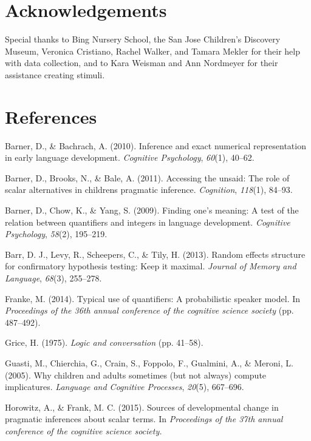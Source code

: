 \documentclass[10pt, letterpaper]{article}
\begin{document}
\section{Acknowledgements}\label{acknowledgements}

Special thanks to Bing Nursery School, the San Jose Children's Discovery
Museum, Veronica Cristiano, Rachel Walker, and Tamara Mekler for their
help with data collection, and to Kara Weisman and Ann Nordmeyer for
their assistance creating stimuli.

\section{References}\label{references}

\setlength{\parindent}{-0.1in} \setlength{\leftskip}{0.125in} \noindent

Barner, D., \& Bachrach, A. (2010). Inference and exact numerical
representation in early language development. \emph{Cognitive
Psychology}, \emph{60}(1), 40--62.

Barner, D., Brooks, N., \& Bale, A. (2011). Accessing the unsaid: The
role of scalar alternatives in childrens pragmatic inference.
\emph{Cognition}, \emph{118}(1), 84--93.

Barner, D., Chow, K., \& Yang, S. (2009). Finding one's meaning: A test
of the relation between quantifiers and integers in language
development. \emph{Cognitive Psychology}, \emph{58}(2), 195--219.

Barr, D. J., Levy, R., Scheepers, C., \& Tily, H. (2013). Random effects
structure for confirmatory hypothesis testing: Keep it maximal.
\emph{Journal of Memory and Language}, \emph{68}(3), 255--278.

Franke, M. (2014). Typical use of quantifiers: A probabilistic speaker
model. In \emph{Proceedings of the 36th annual conference of the
cognitive science society} (pp. 487--492).

Grice, H. (1975). \emph{Logic and conversation} (pp. 41--58).

Guasti, M., Chierchia, G., Crain, S., Foppolo, F., Gualmini, A., \&
Meroni, L. (2005). Why children and adults sometimes (but not always)
compute implicatures. \emph{Language and Cognitive Processes},
\emph{20}(5), 667--696.

Horowitz, A., \& Frank, M. C. (2015). Sources of developmental change in
pragmatic inferences about scalar terms. In \emph{Proceedings of the
37th annual conference of the cognitive science society.}
\end{document}
